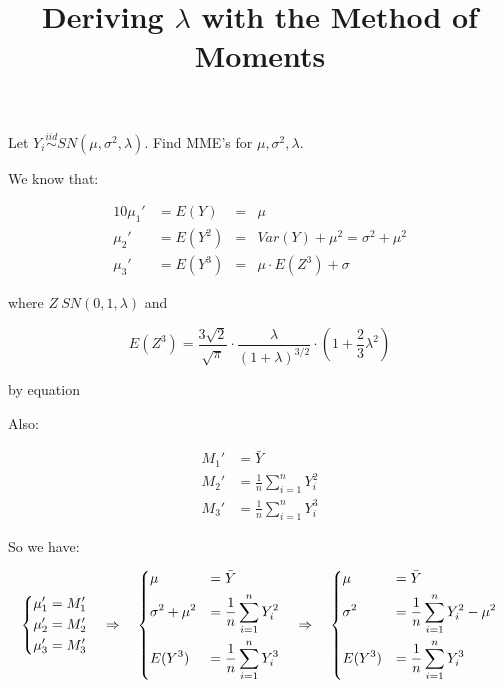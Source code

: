 \documentclass{article}
\begin{document}
\title {Deriving $\lambda$ with the Method of Moments}
\date{}
\maketitle

Let $Y_i \overset{iid}{\sim} SN(\mu, \sigma^2, \lambda)$. Find MME's for $\mu, \sigma^2, \lambda$.

We know that:

\begin{alignat*}{10}
  \mu_1' &= E(Y) &=& \mu \\
  \mu_2' &= E(Y^2) &=& Var (Y) + \mu^2 = \sigma^2 + \mu^2 \\
  \mu_3' &= E(Y^3) &=& \mu \cdot E(Z^3) + \sigma
\end{alignat*}

where $Z ~ SN(0, 1, \lambda)$ and

\[
E(Z^3) = \frac{3 \sqrt{2}}{\sqrt{\pi}} \cdot \frac{\lambda}{(1 + \lambda)^{3/2}} \cdot \left( 1 +
  \frac{2}{3} \lambda^2 \right)
\]

by equation 

Also:

\begin{align*}
  M_1' &= \bar Y \\
  M_2' &= \frac{1}{n} \sum_{i=1}^n Y_i^2 \\
  M_3' &= \frac{1}{n} \sum_{i=1}^n Y_i^3
\end{align*}

So we have:

\begin{equation*}
  \begin{dcases}
    \mu_1' = M_1' \\
    \mu_2' = M_2' \\
    \mu_3' = M_3' \\
  \end{dcases}
  \quad \Rightarrow \quad
  \begin{dcases}
    \mu &= \bar Y \\
    \sigma^2 + \mu^2 &= \frac{1}{n} \sum_{i=1}^n Y_i^2 \\
    E(Y^3) &= \frac{1}{n} \sum_{i=1}^n Y_i^3
  \end{dcases}
  \quad \Rightarrow \quad
  \begin{dcases}
    \mu &= \bar Y \\
    \sigma^2 &= \frac{1}{n} \sum_{i=1}^n Y_i^2 - \mu^2 \\
    E(Y^3) &= \frac{1}{n} \sum_{i=1}^n Y_i^3
  \end{dcases}
\end{equation*}
\end{document}
